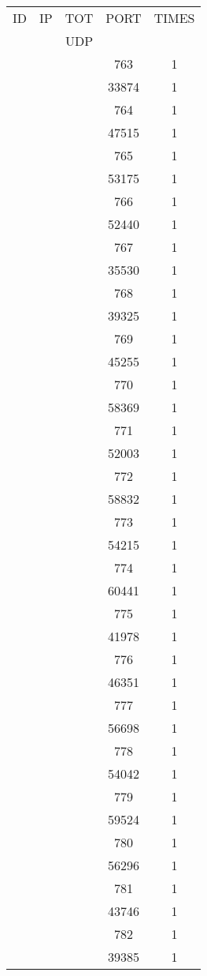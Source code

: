 \documentclass[a4paper]{scrartcl}
\begin{document}
\begin{minipage}[b]{0.5\linewidth}
\begin{tabular}{| c | c | c | c | c |}
\hline
ID & IP & TOT & PORT & TIMES \\ 
   &    & UDP &      &       \\ 
\hline
& & & 763 & 1 \\ & & & 33874 & 1 \\ & & & 764 & 1 \\ & & & 47515 & 1 \\ & & & 765 & 1 \\ & & & 53175 & 1 \\ & & & 766 & 1 \\ & & & 52440 & 1 \\ & & & 767 & 1 \\ & & & 35530 & 1 \\ & & & 768 & 1 \\ & & & 39325 & 1 \\ & & & 769 & 1 \\ & & & 45255 & 1 \\ & & & 770 & 1 \\ & & & 58369 & 1 \\ & & & 771 & 1 \\ & & & 52003 & 1 \\ & & & 772 & 1 \\ & & & 58832 & 1 \\ & & & 773 & 1 \\ & & & 54215 & 1 \\ & & & 774 & 1 \\ & & & 60441 & 1 \\ & & & 775 & 1 \\ & & & 41978 & 1 \\ & & & 776 & 1 \\ & & & 46351 & 1 \\ & & & 777 & 1 \\ & & & 56698 & 1 \\ & & & 778 & 1 \\ & & & 54042 & 1 \\ & & & 779 & 1 \\ & & & 59524 & 1 \\ & & & 780 & 1 \\ & & & 56296 & 1 \\ & & & 781 & 1 \\ & & & 43746 & 1 \\ & & & 782 & 1 \\ & & & 39385 & 1 \\ \hline\end{tabular}\end{minipage} \hfill\begin{minipage}[b]{0.5\linewidth}\begin{tabular}{| c | c | c | c | c |}

\end{tabular}
\end{minipage}
\end{document}
